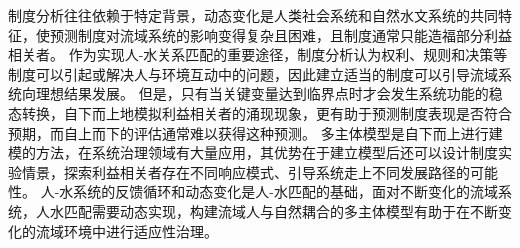 制度分析往往依赖于特定背景，动态变化是人类社会系统和自然水文系统的共同特征，使预测制度对流域系统的影响变得复杂且困难，且制度通常只能造福部分利益相关者\cite{epstein2015}。
作为实现人-水关系匹配的重要途径，制度分析认为权利、规则和决策等制度可以引起或解决人与环境互动中的问题，因此建立适当的制度可以引导流域系统向理想结果发展\cite{wang2019c}。
但是，只有当关键变量达到临界点时才会发生系统功能的稳态转换，自下而上地模拟利益相关者的涌现现象，更有助于预测制度表现是否符合预期，而自上而下的评估通常难以获得这种预测\cite{reyers2018}。
多主体模型是自下而上进行建模的方法，在系统治理领域有大量应用，其优势在于建立模型后还可以设计制度实验情景，探索利益相关者存在不同响应模式、引导系统走上不同发展路径的可能性。
人-水系统的反馈循环和动态变化是人-水匹配的基础，面对不断变化的流域系统，人水匹配需要动态实现，构建流域人与自然耦合的多主体模型有助于在不断变化的流域环境中进行适应性治理。

